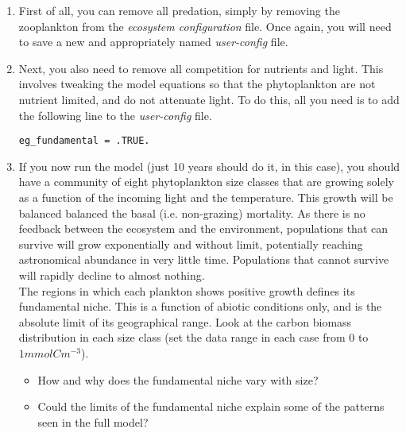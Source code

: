 \documentclass[11pt,fleqn]{book} %
\begin{document}
\begin{enumerate}[noitemsep]
\vspace{1mm}
\item First of all, you can remove all predation, simply by removing the zooplankton from the \textit{ecosystem configuration} file. Once again, you will need to save a new and appropriately named \textit{user-config} file.
\vspace{1mm}
\item Next, you also need to remove all competition for nutrients and light. This involves tweaking the model equations so that the phytoplankton are not nutrient limited, and do not attenuate light. To do this, all you need is to add the following line to the \textit{user-config} file.
\vspace{-1mm}
\small\begin{verbatim}
eg_fundamental = .TRUE.
\end{verbatim}\normalsize
\vspace{-1mm}
\item If you now run the model (just 10 years should do it, in this case), you should have a community of eight phytoplankton size classes that are growing solely as a function of the incoming light and the temperature. This growth will be balanced balanced the basal (i.e. non-grazing) mortality. As there is no feedback between the ecosystem and the environment, populations that can survive will grow exponentially and without limit, potentially reaching astronomical abundance in very little time. Populations that cannot survive will rapidly decline to almost nothing.
\\The regions in which each plankton shows positive growth defines its fundamental niche. This is a function of abiotic conditions only, and is the absolute limit of its geographical range. Look at the carbon biomass distribution in each size class (set the data range in each case from \(0\) to \(1mmolCm^{-3}\)).
\vspace{1mm}
\begin{itemize}
\item How and why does the fundamental niche vary with size?
\item Could the limits of the fundamental niche explain some of the patterns seen in the full model?
\end{itemize}

\end{enumerate}
\vspace{2mm}

\end{document}

